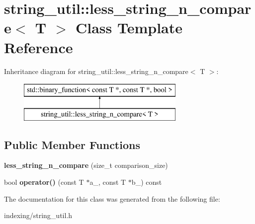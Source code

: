 \hypertarget{classstring__util_1_1less__string__n__compare}{\section{string\-\_\-util\-:\-:less\-\_\-string\-\_\-n\-\_\-compare$<$ T $>$ Class Template Reference}
\label{classstring__util_1_1less__string__n__compare}
}
Inheritance diagram for string\-\_\-util\-:\-:less\-\_\-string\-\_\-n\-\_\-compare$<$ T $>$\-:\begin{figure}[H]
\begin{center}
\leavevmode
\includegraphics[height=2.000000cm]{classstring__util_1_1less__string__n__compare}
\end{center}
\end{figure}
\subsection*{Public Member Functions}
\begin{DoxyCompactItemize}
\item 
\hypertarget{classstring__util_1_1less__string__n__compare_a42b269c0aa27c5ace8b3eeb782f6d335}{{\bfseries less\-\_\-string\-\_\-n\-\_\-compare} (size\-\_\-t comparison\-\_\-size)}\label{classstring__util_1_1less__string__n__compare_a42b269c0aa27c5ace8b3eeb782f6d335}

\item 
\hypertarget{classstring__util_1_1less__string__n__compare_ab6f6bb1fbd6421cb848bba88ce18f6e0}{bool {\bfseries operator()} (const T $\ast$a\-\_\-, const T $\ast$b\-\_\-) const }\label{classstring__util_1_1less__string__n__compare_ab6f6bb1fbd6421cb848bba88ce18f6e0}

\end{DoxyCompactItemize}


The documentation for this class was generated from the following file\-:\begin{DoxyCompactItemize}
\item 
indexing/string\-\_\-util.\-h\end{DoxyCompactItemize}
